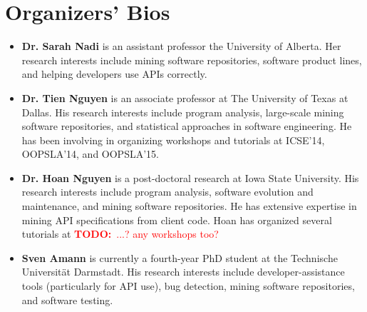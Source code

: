 \documentclass[10pt, conference]{IEEEtran}
\newcommand{\todo}[1]{{\textcolor{red}{\textbf{TODO:}~#1}}}
\begin{document}
\section{Organizers' Bios}
\begin{itemize}
\item \textbf{Dr. Sarah Nadi} is an assistant professor the University of Alberta. Her research interests include mining software repositories, software product lines, and helping developers use APIs correctly.

\item \textbf{Dr. Tien Nguyen} is an associate professor at The University of Texas at Dallas. His research interests include program analysis, large-scale mining software repositories, and statistical approaches in software engineering. He has been involving in organizing workshops and tutorials at ICSE’14, OOPSLA’14, and OOPSLA’15.

\item \textbf{Dr. Hoan Nguyen} is a post-doctoral research at Iowa State University. His research interests include program analysis, software evolution and maintenance, and mining software repositories. He has extensive expertise in mining API specifications from client code. Hoan has organized several tutorials at \todo{...? any workshops too?}

\item \textbf{Sven Amann} is currently a fourth-year PhD student at the Technische Universit\"{a}t Darmstadt. His research interests include developer-assistance tools (particularly for API use), bug detection, mining software repositories, and software testing.
\end{itemize}



\end{document}
